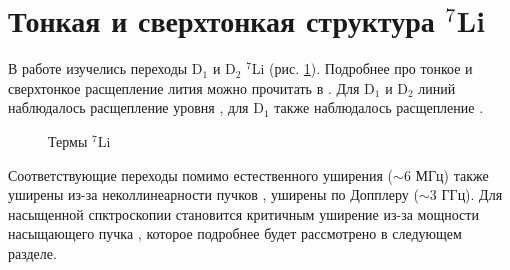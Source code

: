 \section{Тонкая и сверхтонкая структура \texorpdfstring{${}^7$Li}{7Li}}

В работе изучелись переходы D${}_1$ и D${}_2$ ${}^7$Li (рис. \ref{fig:li_levels}). 
Подробнее про тонкое и сверхтонкое расщепление лития можно прочитать в \cite{gold}.
Для D${}_1$ и D${}_2$ линий наблюдалось расщепление уровня , для D${}_1$ также наблюдалось расщепление .

\begin{figure}[h]
    \centering
    \caption{Термы ${}^7$Li}
    \label{fig:li_levels}
\end{figure}


Соответствующие переходы помимо естественного уширения ($\sim 6$ МГц) также уширены из-за неколлинеарности пучков \cite{cross_beams}, уширены по Допплеру \cite{demtreder,gold} ($\sim 3$ ГГц). Для насыщенной спктроскопии становится критичным уширение из-за мощности насыщающего пучка \cite{gold}, которое подробнее будет рассмотрено в следующем разделе.